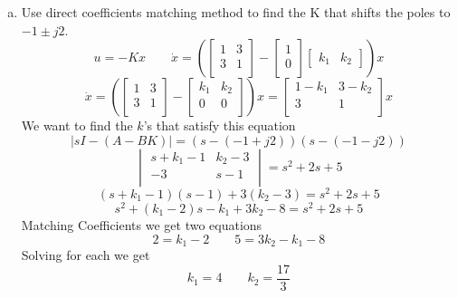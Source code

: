 \documentclass{article}
\begin{document}
\begin{enumerate}[a.]
\item Use direct coefficients matching method to find the K that shifts the poles to $-1\pm j2$.
\newline
$$
u = -Kx \qquad
\dot{x}
=
(
\begin{bmatrix}
1 & 3 \\
3 & 1 \\
\end{bmatrix}
-
\begin{bmatrix}
1 \\
0 \\
\end{bmatrix}
\begin{bmatrix} k_1 & k_2 \end{bmatrix}
)
x
$$
$$
\dot{x}
=
(
\begin{bmatrix}
1 & 3 \\
3 & 1 \\
\end{bmatrix}
-
\begin{bmatrix}
k_1 & k_2 \\
0   &  0  \\
\end{bmatrix}
)
x
=
\begin{bmatrix}
1-k_1 & 3-k_2 \\
3 & 1 \\
\end{bmatrix}
x
$$
We want to find the $k$'s that satisfy this equation
$$|sI-(A-BK)| = (s-(-1+j2))(s-(-1-j2))$$
$$
\begin{vmatrix}
s + k_1 -1 & k_2 - 3 \\
-3         & s-1 \\
\end{vmatrix}
= s^2 + 2s + 5
$$
$$
(s + k_1 -1)(s-1)+3(k_2 - 3)
= s^2 + 2s + 5
$$
$$
s^2 + (k_1-2)s -k_1 + 3k_2-8
= s^2 + 2s + 5
$$
Matching Coefficients we get two equations
$$ 2 = k_1-2 \qquad 5 = 3k_2 -k_1-8 $$
Solving for each we get
$$ k_1 = 4 \qquad k_2 = \frac{17}{3} $$


\end{enumerate}
\end{document}
